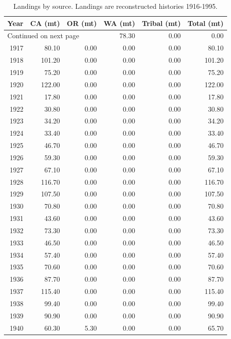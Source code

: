 \documentclass[12pt,]{article}
\begin{document}
\begin{longtable}{rrrrrr}
\caption{Landings by source.  Landings are reconstructed histories 1916-1995.} \\ 
  \hline
Year & CA (mt) & OR (mt) & WA (mt) & Tribal (mt) & Total (mt) \\ 
  \hline 
\endhead 
\hline 
\multicolumn{3}{l}{\footnotesize Continued on next page} 
\endfoot 
\endlastfoot 
 \hline
1916 & 78.30 & 0.00 & 0.00 & 0.00 & 78.30 \\ 
  1917 & 80.10 & 0.00 & 0.00 & 0.00 & 80.10 \\ 
  1918 & 101.20 & 0.00 & 0.00 & 0.00 & 101.20 \\ 
  1919 & 75.20 & 0.00 & 0.00 & 0.00 & 75.20 \\ 
  1920 & 122.00 & 0.00 & 0.00 & 0.00 & 122.00 \\ 
  1921 & 17.80 & 0.00 & 0.00 & 0.00 & 17.80 \\ 
  1922 & 30.80 & 0.00 & 0.00 & 0.00 & 30.80 \\ 
  1923 & 34.20 & 0.00 & 0.00 & 0.00 & 34.20 \\ 
  1924 & 33.40 & 0.00 & 0.00 & 0.00 & 33.40 \\ 
  1925 & 46.70 & 0.00 & 0.00 & 0.00 & 46.70 \\ 
  1926 & 59.30 & 0.00 & 0.00 & 0.00 & 59.30 \\ 
  1927 & 67.10 & 0.00 & 0.00 & 0.00 & 67.10 \\ 
  1928 & 116.70 & 0.00 & 0.00 & 0.00 & 116.70 \\ 
  1929 & 107.50 & 0.00 & 0.00 & 0.00 & 107.50 \\ 
  1930 & 70.80 & 0.00 & 0.00 & 0.00 & 70.80 \\ 
  1931 & 43.60 & 0.00 & 0.00 & 0.00 & 43.60 \\ 
  1932 & 73.30 & 0.00 & 0.00 & 0.00 & 73.30 \\ 
  1933 & 46.50 & 0.00 & 0.00 & 0.00 & 46.50 \\ 
  1934 & 57.40 & 0.00 & 0.00 & 0.00 & 57.40 \\ 
  1935 & 70.60 & 0.00 & 0.00 & 0.00 & 70.60 \\ 
  1936 & 87.70 & 0.00 & 0.00 & 0.00 & 87.70 \\ 
  1937 & 115.40 & 0.00 & 0.00 & 0.00 & 115.40 \\ 
  1938 & 99.40 & 0.00 & 0.00 & 0.00 & 99.40 \\ 
  1939 & 90.90 & 0.00 & 0.00 & 0.00 & 90.90 \\ 
  1940 & 60.30 & 5.30 & 0.00 & 0.00 & 65.70 \\ 

\end{longtable}
\end{document}
